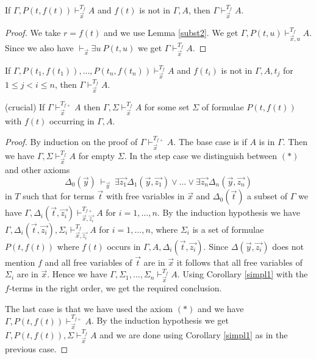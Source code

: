 \documentclass{fundam}
\begin{document}
\begin{lemma}\label{simpl}
If $\Gamma,P(t,f(t))\vdash_{\vec{x}}^{T_f} A$ and
$f(t)$ is not in $\Gamma,A$, then $\Gamma\vdash_{\vec{x}}^{T_f} A$.
\end{lemma}

\begin{proof}
We take $r = f(t)$ and we use Lemma \ref{subst2}. We get
$\Gamma,P(t,u)\vdash_{\vec{x},u}^{T_f} A$. Since we also have
$\vdash_{\vec{x}}\exists u~P(t,u)$ we get  $\Gamma\vdash_{\vec{x}}^{T_f} A$.
\end{proof}

\begin{corollary}\label{simpl1}
If $\Gamma,P(t_1,f(t_1)),\dots,P(t_n,f(t_n))\vdash_{\vec{x}}^{T_f} A$ and
$f(t_i)$ is not in $\Gamma,A,t_j$ for $1\leq j < i \leq n$,
then $\Gamma\vdash_{\vec{x}}^{T_f} A$.
\end{corollary}


\begin{lemma} \label{crucial} (crucial) 
If $\Gamma\vdash_{\vec{x}}^{T_{f{+}}} A$ then $\Gamma,\Sigma\vdash_{\vec{x}}^{T_f} A$ for
some set $\Sigma$ of formulae $P(t,f(t))$ with $f(t)$ occurring in $\Gamma,A$.
\end{lemma}

\begin{proof}
By induction on the proof of $\Gamma\vdash_{\vec{x}}^{T_{f{+}}} A$.
The base case is if $A$ is in $\Gamma$. Then we have
$\Gamma,\Sigma\vdash_{\vec{x}}^{T_f} A$ for empty $\Sigma$.
In the step case we distinguish between $(*)$ and other axioms
$$
\Delta_0(\vec{y})~\vdash_{\vec{y}}~
\exists \vec{z_1}\Delta_1(\vec{y},\vec{z_1})\vee\dots\vee\exists \vec{z_n}\Delta_n(\vec{y},\vec{z_n})
$$
in $T$ such that for terms $\vec{t}$ with free variables in $\vec{x}$ and
$\Delta_0(\vec{t})$ a subset of $\Gamma$ we have
$\Gamma,\Delta_i(\vec{t},\vec{z_i})\vdash_{\vec{x},\vec{z_i}}^{T_{f{+}}} A$ for $i=1,\dots,n$.
By the induction hypothesis we have $\Gamma,\Delta_i(\vec{t},\vec{z_i}), \Sigma_i\vdash_{\vec{x},\vec{z_i}}^{T_f} A$
for $i = 1,\dots,n$, where $\Sigma_i$ is a set of formulae $P(t,f(t))$ where
$f(t)$ occurs in $\Gamma,A,\Delta_i(\vec{t},\vec{z_i})$.
Since $\Delta(\vec{y},\vec{z_i})$ does not mention $f$ and all free variables of $\vec{t}$ are
in $\vec{x}$ it follows that all free variables of $\Sigma_i$ are in $\vec{x}$.
Hence we have $\Gamma,\Sigma_1,\dots,\Sigma_n\vdash_{\vec{x}}^{T_f} A$.
Using Corollary \ref{simpl1} with the $f$-terms in the right order, 
we get the required conclusion.

The last case is that we have used the axiom $(*)$ and
we have $\Gamma,P(t,f(t))\vdash_{\vec{x}}^{T_{f{+}}} A$. By the induction hypothesis we get
$\Gamma,P(t,f(t)),\Sigma \vdash_{\vec{x}}^{T_f} A$ and we are
done using Corollary \ref{simpl1} as in the previous case.
\end{proof}
\end{document}
